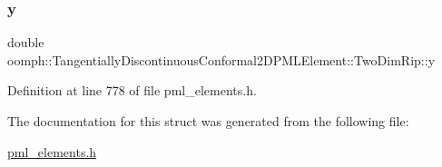 \subsubsection{\texorpdfstring{y}{y}}
{\footnotesize\ttfamily double oomph\+::\+Tangentially\+Discontinuous\+Conformal2\+D\+P\+M\+L\+Element\+::\+Two\+Dim\+Rip\+::y}



Definition at line 778 of file pml\+\_\+elements.\+h.



The documentation for this struct was generated from the following file\+:\begin{DoxyCompactItemize}
\item 
\hyperlink{pml__elements_8h}{pml\+\_\+elements.\+h}\end{DoxyCompactItemize}
